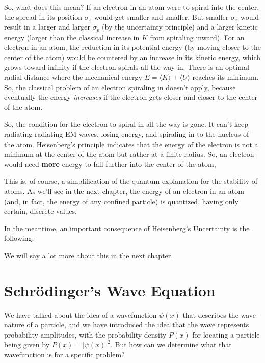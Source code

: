 So, what does this mean? If an electron in an atom were to spiral into
the center, the spread in its position $\sigma_x$ would get smaller
and smaller. But smaller $\sigma_x$ would result in a larger and larger
$\sigma_p$ (by the uncertainty principle) and a larger kinetic energy
(larger than the classical increase in $K$ from spiraling inward). For
an electron in an atom, the reduction in its potential energy (by moving
closer to the center of the atom) would be countered by an increase in
its kinetic energy, which grows toward infinity if the electron spirals
all the way in. There is an optimal radial distance where the mechanical
energy $E = \langle K\rangle + \langle U\rangle$ reaches its minimum.
So, the classical problem of an electron spiraling in doesn't apply,
because eventually the energy {\it increases} if the electron gets closer
and closer to the center of the atom.

So, the condition for the electron to spiral in all the way is gone. It can't
keep radiating radiating EM waves, losing energy, and spiraling in to the
nucleus of the atom. Heisenberg's principle indicates that the energy of the
electron is not a minimum at the center of the atom but rather at
a finite radius. So, an electron would need {\bf more} energy to
fall further into the center of the atom, 

This is, of course, a simplification of the quantum explanation for
the stability of atoms. As we'll see in the next chapter, the energy of
an electron in an atom (and, in fact, the energy of any confined particle)
is quantized, having only certain, discrete values.

In the meantime, an important consequence of Heisenberg's Uncertainty
is the following:  

\break We will say a lot more about this in the
next chapter.

\section{Schr\"odinger's Wave Equation}
\label{sec:schrodinger_eqn}

We have talked about the idea of a wavefunction $\psi(x)$ that describes
the wave-nature of a particle, and we have introduced the idea that the
wave represents probability amplitudes, with the probability density
$P(x)$ for locating a particle being given by $P(x) = |\psi(x)|^2$. But
how can we determine what that wavefunction is for a specific problem?

